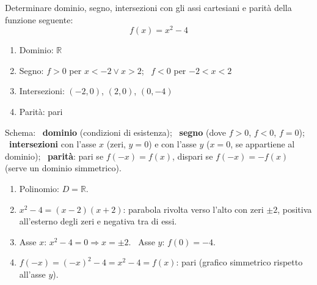 
\begin{question}[ID=1.1, subtitle={Studio di una funzione polinomiale}, difficulty=facile, tags={funzioni, studio di funzione}]
Determinare dominio, segno, intersezioni con gli assi cartesiani e parità della funzione seguente:
\begin{equation*}
    f(x)=x^2-4
\end{equation*}
\begin{solution}
\begin{enumerate}
    \item Dominio: $\mathbb{R}$
    \item Segno: $f>0$ per $x<-2\vee x>2$; \ $f<0$ per $-2<x<2$
    \item Intersezioni: $(-2,0)$, $(2,0)$, $(0,-4)$
    \item Parità: pari
\end{enumerate}
\end{solution}
\begin{explanation}
Schema: \ \textbf{dominio} (condizioni di esistenza); \ \textbf{segno} (dove $f>0$, $f<0$, $f=0$); \ \textbf{intersezioni} con l'asse $x$ (zeri, $y=0$) e con l'asse $y$ ($x=0$, se appartiene al dominio); \ \textbf{parità}: pari se $f(-x)=f(x)$, dispari se $f(-x)=-f(x)$ (serve un dominio simmetrico).
\begin{enumerate}
    \item Polinomio: $D=\mathbb{R}$.
    \item $x^2-4=(x-2)(x+2)$: parabola rivolta verso l'alto con zeri $\pm2$, positiva all'esterno degli zeri e negativa tra di essi.
    \item Asse $x$: $x^2-4=0 \Rightarrow x=\pm2$. \ Asse $y$: $f(0)=-4$.
    \item $f(-x)=(-x)^2-4=x^2-4=f(x)$: pari (grafico simmetrico rispetto all'asse $y$).
\end{enumerate}
\end{explanation}
\end{question}


